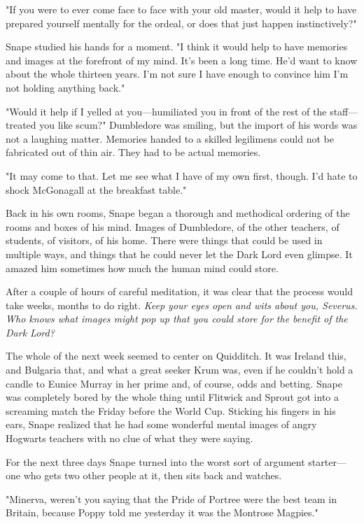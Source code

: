 "If you were to ever come face to face with your old master, would it help to have prepared yourself mentally for the ordeal, or does that just happen instinctively?"

Snape studied his hands for a moment. "I think it would help to have memories and images at the forefront of my mind. It's been a long time. He'd want to know about the whole thirteen years. I'm not sure I have enough to convince him I'm not holding anything back."

"Would it help if I yelled at you—humiliated you in front of the rest of the staff—treated you like scum?" Dumbledore was smiling, but the import of his words was not a laughing matter. Memories handed to a skilled legilimens could not be fabricated out of thin air. They had to be actual memories.

"It may come to that. Let me see what I have of my own first, though. I'd hate to shock McGonagall at the breakfast table."

Back in his own rooms, Snape began a thorough and methodical ordering of the rooms and boxes of his mind. Images of Dumbledore, of the other teachers, of students, of visitors, of his home. There were things that could be used in multiple ways, and things that he could never let the Dark Lord even glimpse. It amazed him sometimes how much the human mind could store.

After a couple of hours of careful meditation, it was clear that the process would take weeks, months to do right. \emph{Keep your eyes open and wits about you, Severus. Who knows what images might pop up that you could store for the benefit of the Dark Lord?}

The whole of the next week seemed to center on Quidditch. It was Ireland this, and Bulgaria that, and what a great seeker Krum was, even if he couldn't hold a candle to Eunice Murray in her prime and, of course, odds and betting. Snape was completely bored by the whole thing until Flitwick and Sprout got into a screaming match the Friday before the World Cup. Sticking his fingers in his ears, Snape realized that he had some wonderful mental images of angry Hogwarts teachers with no clue of what they were saying.

For the next three days Snape turned into the worst sort of argument starter—one who gets two other people at it, then sits back and watches.

"Minerva, weren't you saying that the Pride of Portree were the best team in Britain, because Poppy told me yesterday it was the Montrose Magpies."

